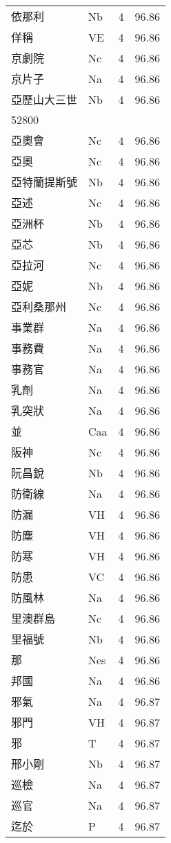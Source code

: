 \documentclass[twocolumn]{book}
\begin{document}
\begin{supertabular}{llrr}
依那利 & Nb & 4 &  96.86\\
佯稱 & VE & 4 &  96.86\\
京劇院 & Nc & 4 &  96.86\\
京片子 & Na & 4 &  96.86\\
亞歷山大三世 & Nb & 4 &  96.86\\
52800\\
亞奧會 & Nc & 4 &  96.86\\
亞奧 & Nc & 4 &  96.86\\
亞特蘭提斯號 & Nb & 4 &  96.86\\
亞述 & Nc & 4 &  96.86\\
亞洲杯 & Nb & 4 &  96.86\\
亞芯 & Nb & 4 &  96.86\\
亞拉河 & Nc & 4 &  96.86\\
亞妮 & Nb & 4 &  96.86\\
亞利桑那州 & Nc & 4 &  96.86\\
事業群 & Na & 4 &  96.86\\
事務費 & Na & 4 &  96.86\\
事務官 & Na & 4 &  96.86\\
乳劑 & Na & 4 &  96.86\\
乳突狀 & Na & 4 &  96.86\\
並 & Caa & 4 &  96.86\\
阪神 & Nc & 4 &  96.86\\
阮昌銳 & Nb & 4 &  96.86\\
防衛線 & Na & 4 &  96.86\\
防漏 & VH & 4 &  96.86\\
防塵 & VH & 4 &  96.86\\
防寒 & VH & 4 &  96.86\\
防患 & VC & 4 &  96.86\\
防風林 & Na & 4 &  96.86\\
里澳群島 & Nc & 4 &  96.86\\
里福號 & Nb & 4 &  96.86\\
那 & Nes & 4 &  96.86\\
邦國 & Na & 4 &  96.86\\
邪氣 & Na & 4 &  96.87\\
邪門 & VH & 4 &  96.87\\
邪 & T & 4 &  96.87\\
邢小剛 & Nb & 4 &  96.87\\
巡檢 & Na & 4 &  96.87\\
巡官 & Na & 4 &  96.87\\
迄於 & P & 4 &  96.87\\

\end{supertabular}
\end{document}
